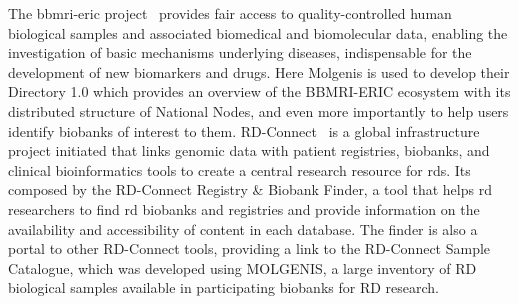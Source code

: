 The \gls{bbmri-eric} project~\cite{bbmrieric} provides fair access to
quality-controlled human biological samples and associated biomedical and biomolecular
data, enabling the investigation of basic mechanisms underlying diseases, indispensable
for the development of new biomarkers and drugs.
Here Molgenis is used to develop their Directory 1.0 which provides an overview of the
BBMRI-ERIC ecosystem with its distributed structure of National Nodes, and even more
importantly to help users identify biobanks of interest to them.
RD-Connect~\cite{rdconnect} is a global infrastructure project initiated that links
genomic data with patient registries, biobanks, and clinical bioinformatics tools to
create a central research resource for \gls{rd}s.
Its composed by the RD-Connect Registry \& Biobank Finder, a tool that helps \gls{rd}
researchers to find \gls{rd} biobanks and registries and provide information on the
availability and accessibility of content in each database.
The finder is also a portal to other RD-Connect tools, providing a link to the
RD-Connect Sample Catalogue, which was developed using MOLGENIS, a large inventory of
RD biological samples available in participating biobanks for RD research. 



